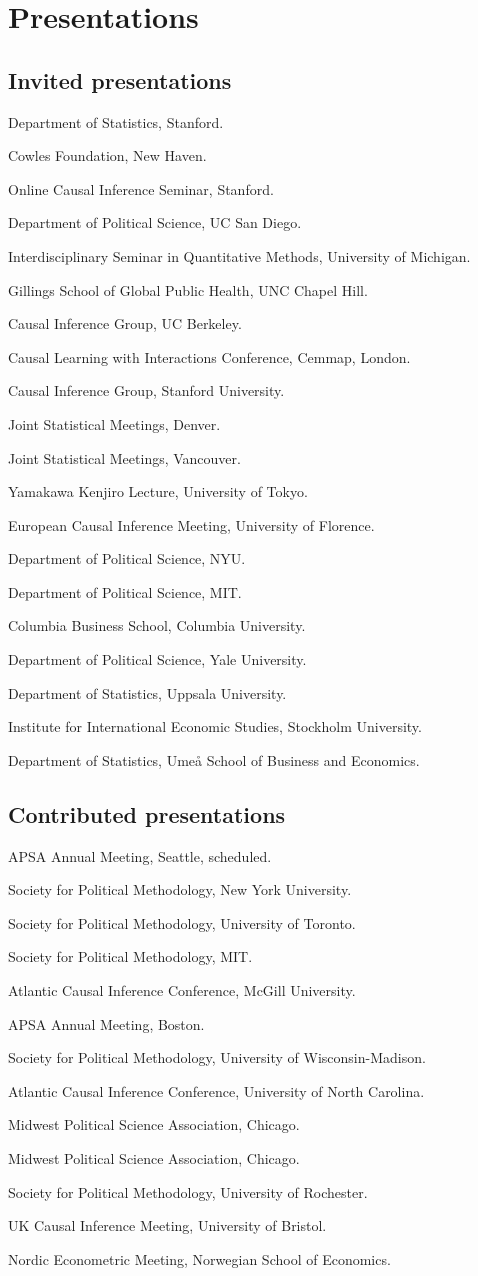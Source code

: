 \documentclass[10pt,letterpaper]{article}
\newenvironment{singledatelist}{
	\begin{list}{}{
		\setlength{\parskip}{0pt}
		\setlength{\itemsep}{4pt}
		\setlength{\parsep}{0.3em}
		\setlength{\leftmargin}{3.5em}
		\setlength{\labelwidth}{3.5em}
		\setlength{\labelsep}{1.5em}
		}
	}{
\end{list}
}
\newcommand{\dateitem}[2][]{\item[{#1}] {#2}}
\begin{document}
	\section*{Presentations}

	\subsection*{Invited presentations}

	\begin{singledatelist}
		\dateitem[2021]{Department of Statistics, Stanford.}
		\dateitem{Cowles Foundation, New Haven.}
		\dateitem{Online Causal Inference Seminar, Stanford.}
		\dateitem[2020]{Department of Political Science, UC San Diego.}
		\dateitem{Interdisciplinary Seminar in Quantitative Methods, University of Michigan.}
		\dateitem{Gillings School of Global Public Health, UNC Chapel Hill.}
		\dateitem{Causal Inference Group, UC Berkeley.}
		\dateitem[2019]{Causal Learning with Interactions Conference, Cemmap, London.}
		\dateitem{Causal Inference Group, Stanford University.}
		\dateitem{Joint Statistical Meetings, Denver.}
		\dateitem[2018]{Joint Statistical Meetings, Vancouver.}
		\dateitem{Yamakawa Kenjiro Lecture, University of Tokyo.}
		\dateitem{European Causal Inference Meeting, University of Florence.}
		\dateitem{Department of Political Science, NYU.}
		\dateitem{Department of Political Science, MIT.}
		\dateitem[2016]{Columbia Business School, Columbia University.}
		\dateitem[2015]{Department of Political Science, Yale University.}
		\dateitem{Department of Statistics, Uppsala University.}
		\dateitem{Institute for International Economic Studies, Stockholm University.}
		\dateitem[2013]{Department of Statistics, Umeå School of Business and Economics.}
	\end{singledatelist}


	\subsection*{Contributed presentations}

	\begin{singledatelist}
		\dateitem[2021]{APSA Annual Meeting, Seattle, scheduled.}
		\dateitem{Society for Political Methodology, New York University.}
		\dateitem[2020]{Society for Political Methodology, University of Toronto.}
		\dateitem[2019]{Society for Political Methodology, MIT.}
		\dateitem{Atlantic Causal Inference Conference, McGill University.}
		\dateitem[2018]{APSA Annual Meeting, Boston.}
		\dateitem[2017]{Society for Political Methodology, University of Wisconsin-Madison.}
		\dateitem{Atlantic Causal Inference Conference, University of North Carolina.}
		\dateitem{Midwest Political Science Association, Chicago.}
		\dateitem[2016]{Midwest Political Science Association, Chicago.}
		\dateitem[2015]{Society for Political Methodology, University of Rochester.}
		\dateitem{UK Causal Inference Meeting, University of Bristol.}
		\dateitem[2013]{Nordic Econometric Meeting, Norwegian School of Economics.}
	\end{singledatelist}
\end{document}
